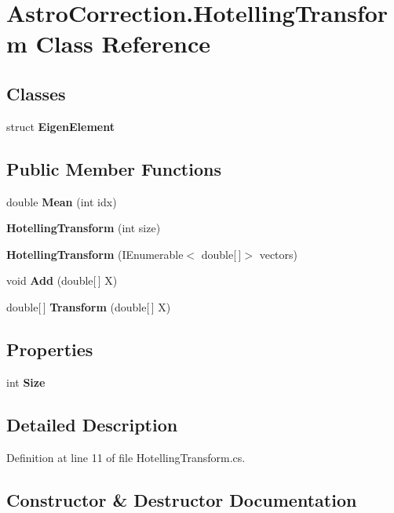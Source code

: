 \section{AstroCorrection.HotellingTransform Class Reference}
\label{class_astro_correction_1_1_hotelling_transform}
\subsection*{Classes}
\begin{DoxyCompactItemize}
\item 
struct {\bfseries EigenElement}
\end{DoxyCompactItemize}
\subsection*{Public Member Functions}
\begin{DoxyCompactItemize}
\item 
double {\bf Mean} (int idx)
\item 
{\bf HotellingTransform} (int size)
\item 
{\bf HotellingTransform} (IEnumerable$<$ double[$\,$]$>$ vectors)
\item 
void {\bf Add} (double[$\,$] X)
\item 
double[$\,$] {\bf Transform} (double[$\,$] X)
\end{DoxyCompactItemize}
\subsection*{Properties}
\begin{DoxyCompactItemize}
\item 
int {\bf Size}\hspace{0.3cm}{\ttfamily  [get, set]}
\end{DoxyCompactItemize}


\subsection{Detailed Description}


Definition at line 11 of file HotellingTransform.cs.

\subsection{Constructor \& Destructor Documentation}
